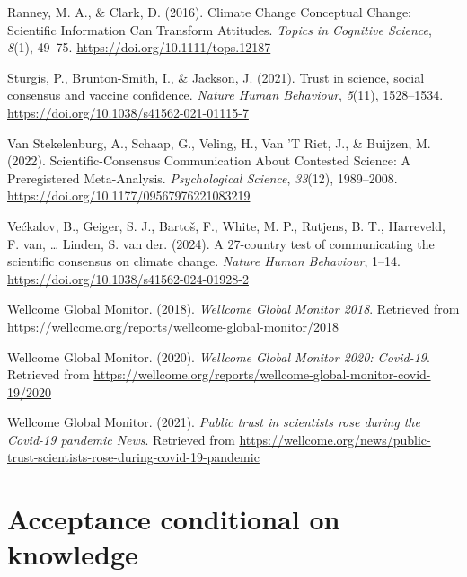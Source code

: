 \documentclass[
  doc,floatsintext]{apa6}
\newlength{\cslhangindent}
\newenvironment{CSLReferences}[2] %
 {\begin{list}{}{%
  \setlength{\itemindent}{0pt}
  \setlength{\leftmargin}{0pt}
  \setlength{\parsep}{0pt}
  \ifodd #1
   \setlength{\leftmargin}{\cslhangindent}
   \setlength{\itemindent}{-1\cslhangindent}
  \fi
  \setlength{\itemsep}{#2\baselineskip}}}
 {\end{list}}
\begin{document}
\begin{CSLReferences}{1}{0}
Ranney, M. A., \& Clark, D. (2016). Climate Change Conceptual Change: Scientific Information Can Transform Attitudes. \emph{Topics in Cognitive Science}, \emph{8}(1), 49--75. \url{https://doi.org/10.1111/tops.12187}

Sturgis, P., Brunton-Smith, I., \& Jackson, J. (2021). Trust in science, social consensus and vaccine confidence. \emph{Nature Human Behaviour}, \emph{5}(11), 1528--1534. \url{https://doi.org/10.1038/s41562-021-01115-7}

Van Stekelenburg, A., Schaap, G., Veling, H., Van 'T Riet, J., \& Buijzen, M. (2022). Scientific-Consensus Communication About Contested Science: A Preregistered Meta-Analysis. \emph{Psychological Science}, \emph{33}(12), 1989--2008. \url{https://doi.org/10.1177/09567976221083219}

Većkalov, B., Geiger, S. J., Bartoš, F., White, M. P., Rutjens, B. T., Harreveld, F. van, \ldots{} Linden, S. van der. (2024). A 27-country test of communicating the scientific consensus on climate change. \emph{Nature Human Behaviour}, 1--14. \url{https://doi.org/10.1038/s41562-024-01928-2}

Wellcome Global Monitor. (2018). \emph{Wellcome Global Monitor 2018}. Retrieved from \url{https://wellcome.org/reports/wellcome-global-monitor/2018}

Wellcome Global Monitor. (2020). \emph{Wellcome Global Monitor 2020: Covid-19}. Retrieved from \url{https://wellcome.org/reports/wellcome-global-monitor-covid-19/2020}

Wellcome Global Monitor. (2021). \emph{Public trust in scientists rose during the Covid-19 pandemic \textbar{} News}. Retrieved from \url{https://wellcome.org/news/public-trust-scientists-rose-during-covid-19-pandemic}

\end{CSLReferences}

\newpage

\appendix


\section{Acceptance conditional on knowledge}\label{acceptance-knowledge}
\end{document}
